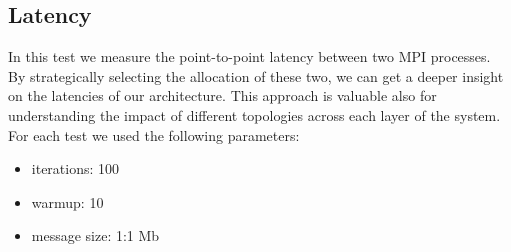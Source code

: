 \subsection{Latency}
    In this test we measure the point-to-point latency between two MPI
    processes. By strategically selecting the allocation of these two,
    we can get a deeper insight on the latencies of our architecture.
    This approach is valuable also for understanding the impact
    of different topologies across each layer of the system.
    For each test we used the following parameters:
    \begin{itemize}
        \item iterations: 100
        \item warmup: 10
        \item message size: 1:1 Mb
    \end{itemize}
